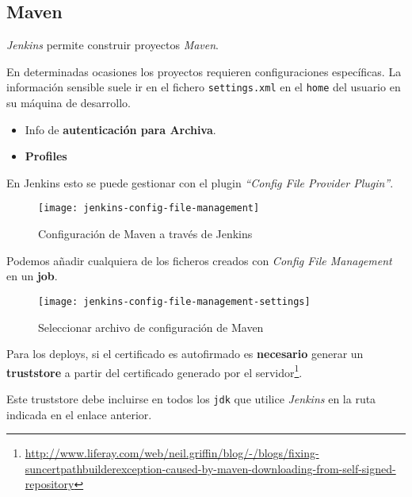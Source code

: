 \subsection{Maven}
\label{sub:jenkins-maven}

\par \emph{Jenkins} permite construir proyectos \emph{Maven}.

\par En determinadas ocasiones los proyectos requieren configuraciones específicas. La información sensible suele ir en el fichero \texttt{settings.xml} en el \texttt{home} del usuario en su máquina de desarrollo.

\begin{itemize}
    \item Info de \textbf{autenticación para Archiva}.
    \item \textbf{Profiles}
\end{itemize}

\par En Jenkins esto se puede gestionar con el plugin \emph{``Config File Provider Plugin''}.

\begin{figure}[H]
    \centering
    \texttt{[image: jenkins-config-file-management]}
    \caption{Configuración de Maven a través de Jenkins}
    \label{fig:jenkins-config-file-management}
\end{figure}

\par Podemos añadir cualquiera de los ficheros creados con \emph{Config File Management} en un \textbf{job}.

\begin{figure}[H]
    \centering
    \texttt{[image: jenkins-config-file-management-settings]}
    \caption{Seleccionar archivo de configuración de Maven}
    \label{fig:jenkins-config-file-management-settings}
\end{figure}

\par Para los deploys, si el certificado es autofirmado es \textbf{necesario} generar un \textbf{truststore} a partir del certificado generado por el servidor\footnote{\url{http://www.liferay.com/web/neil.griffin/blog/-/blogs/fixing-suncertpathbuilderexception-caused-by-maven-downloading-from-self-signed-repository}}.

\par Este truststore debe incluirse en todos los \texttt{jdk} que utilice \emph{Jenkins} en la ruta indicada en el enlace anterior.

